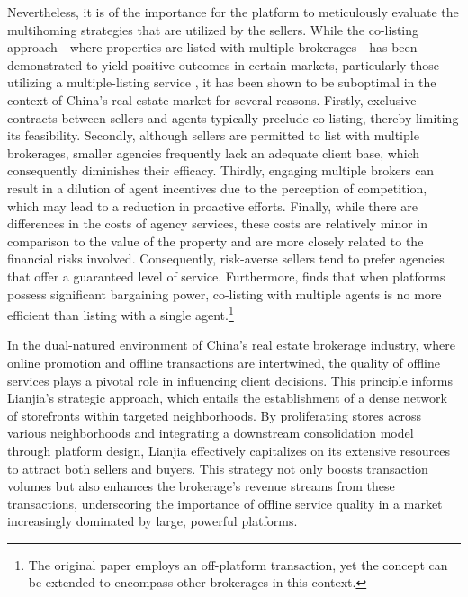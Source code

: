 \documentclass[11pt]{article}
\begin{document}
Nevertheless,  it is of the importance for the platform to meticulously evaluate the multihoming strategies that are utilized by the sellers. While the co-listing approach—where properties are listed with multiple brokerages—has been demonstrated to yield positive outcomes in certain markets, particularly those utilizing a multiple-listing service \citep{RePEc:kap:jrefec:v:67:y:2023:i:3:d:10.1007_s11146-021-09858-w}, it has been shown to be suboptimal in the context of China's real estate market for several reasons. Firstly, exclusive contracts between sellers and agents typically preclude co-listing, thereby limiting its feasibility. Secondly, although sellers are permitted to list with multiple brokerages, smaller agencies frequently lack an adequate client base, which consequently diminishes their efficacy. Thirdly, engaging multiple brokers can result in a dilution of agent incentives due to the perception of competition, which may lead to a reduction in proactive efforts. Finally, while there are differences in the costs of agency services, these costs are relatively minor in comparison to the value of the property and are more closely related to the financial risks involved. Consequently, risk-averse sellers tend to prefer agencies that offer a guaranteed level of service. Furthermore, \citet{bergemann_data_2024} finds that when platforms possess significant bargaining power, co-listing with multiple agents is no more efficient than listing with a single agent.\footnote{The original paper employs an off-platform transaction, yet the concept can be extended to encompass other brokerages in this context.}

In the dual-natured environment of China's real estate brokerage industry, where online promotion and offline transactions are intertwined, the quality of offline services plays a pivotal role in influencing client decisions. This principle informs Lianjia's strategic approach, which entails the establishment of a dense network of storefronts within targeted neighborhoods. By proliferating stores across various neighborhoods and integrating a downstream consolidation model through platform design, Lianjia effectively capitalizes on its extensive resources to attract both sellers and buyers. This strategy not only boosts transaction volumes but also enhances the brokerage's revenue streams from these transactions, underscoring the importance of offline service quality in a market increasingly dominated by large, powerful platforms.
\end{document}
